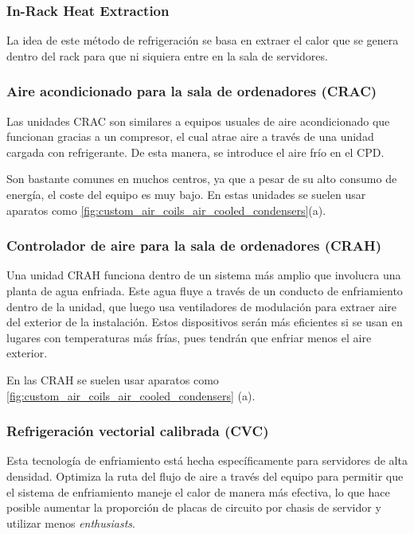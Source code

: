 \subsubsection{In-Rack Heat Extraction}

La idea de este método de refrigeración se basa en extraer el calor que se genera dentro del rack para que ni siquiera entre en la sala de servidores.

\subsubsection{Aire acondicionado para la sala de ordenadores (CRAC)}

Las unidades CRAC son similares a equipos usuales de aire acondicionado que funcionan gracias a un compresor, el cual atrae aire a través de una unidad cargada con refrigerante. De esta manera, se introduce el aire frío en el CPD.

Son bastante comunes en muchos centros, ya que a pesar de su alto consumo de energía, el coste del equipo es muy bajo. En estas unidades se suelen usar aparatos como \eqref{fig:custom_air_coils_air_cooled_condensers}(a).

\subsubsection{Controlador de aire para la sala de ordenadores (CRAH)}

Una unidad CRAH funciona dentro de un sistema más amplio que involucra una planta de agua enfriada. Este agua fluye a través de un conducto de enfriamiento dentro de la unidad, que luego usa ventiladores de modulación para extraer aire del exterior de la instalación. Estos dispositivos serán más eficientes si se usan en lugares con temperaturas más frías, pues tendrán que enfriar menos el aire exterior.

En las CRAH se suelen usar aparatos como \eqref{fig:custom_air_coils_air_cooled_condensers} (a).

\subsubsection{Refrigeración vectorial calibrada (CVC)}

Esta tecnología de enfriamiento está hecha específicamente para servidores de alta densidad. Optimiza la ruta del flujo de aire a través del equipo para permitir que el sistema de enfriamiento maneje el calor de manera más efectiva, lo que hace posible aumentar la proporción de placas de circuito por chasis de servidor y utilizar menos \textit{enthusiasts}.

